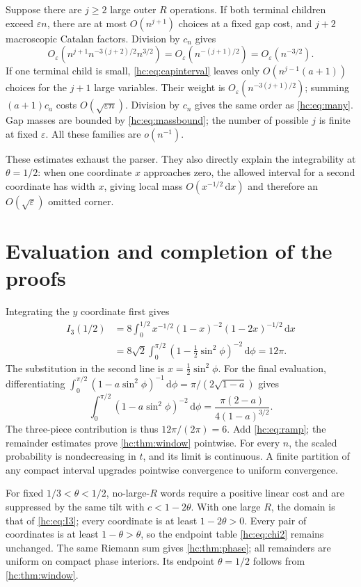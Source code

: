 \documentclass[11pt,a4paper]{article}
\theoremstyle{definition}\newaliascnt{definition}{theorem}
\theoremstyle{remark}\newaliascnt{remark}{theorem}
\newcommand{\dd}{\mathrm d}
\begin{document}
Suppose there are $j\ge2$ large outer $R$ operations. If both terminal
children exceed $\varepsilon n$, there are at most $O(n^{j+1})$ choices at a
fixed gap cost, and $j+2$ macroscopic Catalan factors. Division by $c_n$
gives
\begin{equation}\label{hc:eq:many}
 O_\varepsilon\!\left(n^{j+1}n^{-3(j+2)/2}n^{3/2}\right)
 =O_\varepsilon\!\left(n^{-(j+1)/2}\right)=O_\varepsilon(n^{-3/2}).
\end{equation}
If one terminal child is small, \eqref{hc:eq:capinterval} leaves only
$O(n^{j-1}(a+1))$ choices for the $j+1$ large variables. Their weight is
$O_\varepsilon(n^{-3(j+1)/2})$; summing $(a+1)c_a$ costs
$O(\sqrt{\varepsilon n})$. Division by $c_n$ gives the same order as
\eqref{hc:eq:many}. Gap masses are bounded by \eqref{hc:eq:massbound}; the
number of possible $j$ is finite at fixed $\varepsilon$. All these families
are $o(n^{-1})$.

These estimates exhaust the parser. They also directly explain the
integrability at $\theta=1/2$: when one coordinate $x$ approaches zero, the
allowed interval for a second coordinate has width $x$, giving local mass
$O(x^{-1/2}\,\dd x)$ and therefore an $O(\sqrt\varepsilon)$ omitted corner.

\section{Evaluation and completion of the proofs}
\label{hc:sec:evaluation}
Integrating the $y$ coordinate first gives
\begin{align*}
 I_3(1/2)
 &=8\int_0^{1/2}
   x^{-1/2}(1-x)^{-2}(1-2x)^{-1/2}\,\dd x\\
 &=8\sqrt2\int_0^{\pi/2}
   \left(1-\tfrac12\sin^2\phi\right)^{-2}\,\dd\phi
 =12\pi.
\end{align*}
The substitution in the second line is $x=\tfrac12\sin^2\phi$. For the final
evaluation, differentiating
$\int_0^{\pi/2}(1-a\sin^2\phi)^{-1}\,\dd\phi=\pi/(2\sqrt{1-a})$ gives
\[
 \int_0^{\pi/2}(1-a\sin^2\phi)^{-2}\,\dd\phi
 =\frac{\pi(2-a)}{4(1-a)^{3/2}}.
\]
The three-piece contribution is thus $12\pi/(2\pi)=6$. Add \eqref{hc:eq:ramp};
the remainder estimates prove \cref{hc:thm:window} pointwise. For every $n$,
the scaled probability is nondecreasing in $t$, and its limit is continuous.
A finite partition of any compact interval upgrades pointwise convergence to
uniform convergence.

For fixed $1/3<\theta<1/2$, no-large-$R$ words require a positive linear cost
and are suppressed by the same tilt with $c<1-2\theta$. With one large $R$,
the domain is that of \eqref{hc:eq:I3}; every coordinate is at least
$1-2\theta>0$. Every pair of coordinates is at least $1-\theta>\theta$, so
the endpoint table \eqref{hc:eq:chi2} remains unchanged. The same Riemann sum
gives \cref{hc:thm:phase}; all remainders are uniform on compact phase
interiors. Its endpoint $\theta=1/2$ follows from \cref{hc:thm:window}.
\end{document}
